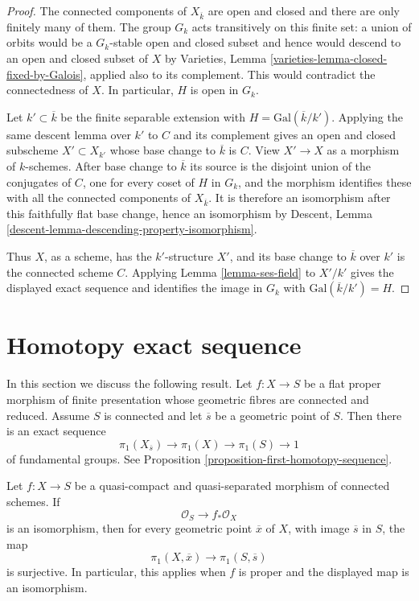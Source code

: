 \begin{proof}
The connected components of $X_{\overline{k}}$ are open and closed and
there are only finitely many of them. The group $G_k$ acts transitively on
this finite set: a union of orbits would be a $G_k$-stable open and closed
subset and hence would descend to an open and closed subset of $X$ by
Varieties, Lemma \ref{varieties-lemma-closed-fixed-by-Galois}, applied also
to its complement. This would contradict the connectedness of $X$.
In particular, $H$ is open in $G_k$.

\medskip\noindent
Let $k' \subset \overline{k}$ be the finite separable extension with
$H = \text{Gal}(\overline{k}/k')$. Applying the same descent lemma over
$k'$ to $C$ and its complement gives an open and closed subscheme
$X' \subset X_{k'}$ whose base change to $\overline{k}$ is $C$.
View $X' \to X$ as a morphism of $k$-schemes. After base change to
$\overline{k}$ its source is the disjoint union of the conjugates of $C$,
one for every coset of $H$ in $G_k$, and the morphism identifies these
with all the connected components of $X_{\overline{k}}$. It is therefore
an isomorphism after this faithfully flat base change, hence an isomorphism
by Descent, Lemma \ref{descent-lemma-descending-property-isomorphism}.

\medskip\noindent
Thus $X$, as a scheme, has the $k'$-structure $X'$, and its base change
to $\overline{k}$ over $k'$ is the connected scheme $C$. Applying
Lemma \ref{lemma-ses-field} to $X'/k'$ gives the displayed exact sequence
and identifies the image in $G_k$ with
$\text{Gal}(\overline{k}/k') = H$.
\end{proof}



\section{Homotopy exact sequence}
\label{section-homotopy-exact-sequence}

\noindent
In this section we discuss the following result.
Let $f : X \to S$ be a flat proper morphism of
finite presentation whose
geometric fibres are connected and reduced.
Assume $S$ is connected and let $\overline{s}$
be a geometric point of $S$. Then there is an exact
sequence
$$
\pi_1(X_{\overline{s}}) \to \pi_1(X) \to \pi_1(S) \to 1
$$
of fundamental groups. See
Proposition \ref{proposition-first-homotopy-sequence}.

\begin{lemma}
\label{lemma-pi1-surjective-pushforward-structure-sheaf}
\begin{reference}
\cite[Expos\'e 182, Lemme 4, p. 212]{FGA}
\end{reference}
Let $f : X \to S$ be a quasi-compact and quasi-separated morphism of
connected schemes. If
$$
\mathcal{O}_S \longrightarrow f_*\mathcal{O}_X
$$
is an isomorphism, then for every geometric point $\overline{x}$ of $X$,
with image $\overline{s}$ in $S$, the map
$$
\pi_1(X, \overline{x}) \longrightarrow \pi_1(S, \overline{s})
$$
is surjective. In particular, this applies when $f$ is proper and the
displayed map is an isomorphism.
\end{lemma}


